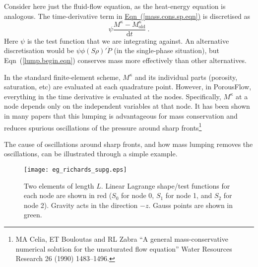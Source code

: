 \documentclass[12pt]{report}
\def\species{\kappa}
\def\d{\mathrm{d}}
\begin{document}
Consider here just the fluid-flow equation, as the heat-energy
equation is analogous.  The time-derivative term in
\hyperref[mass.cons.sp.eqn]{Eqn~(\ref*{mass.cons.sp.eqn})} is discretised as
\begin{equation}
\psi \frac{M^{\species} - M^{\species}_{\mathrm{old}}}{\d t} \ .
\label{lump.begin.eqn}
\end{equation}
Here $\psi$ is the test function that we are integrating against.  An
alternative discretisation would be $\psi\phi(S\rho)'\dot{P}$ (in the
single-phase situation), but Eqn~(\ref{lump.begin.eqn}) conserves mass
more effectively than other alternatives.

In the standard finite-element scheme, $M^{\species}$ and its
individual parts (porosity, saturation, etc) are evaluated at each
quadrature point.  However, in PorousFlow, everything in the time
derivative is evaluated at the nodes.  Specifically, $M^{\species}$ at
a node depends only on the independent variables at that node.  It has
been shown in many papers that this lumping is advantageous for mass
conservation and reduces spurious oscillations of the pressure around
sharp fronts\footnote{MA Celia, ET Bouloutas and RL Zabra ``A general
  mass-conservative numerical solution for the unsaturated flow
  equation''  Water Resources Research 26 (1990) 1483--1496.}

The cause of oscillations around sharp fronts, and how mass lumping
removes the oscillations, can be illustrated through a simple example.

\begin{figure}[htb]
\centering
\texttt{[image: eg\_richards\_supg.eps]}
\caption{Two elements of length $L$.  Linear Lagrange shape/test
  functions for each node are shown in red ($S_{0}$ for node 0,
  $S_{1}$ for node 1, and $S_{2}$ for node 2).  Gravity acts in the
  direction $-z$.  Gauss points are shown in green.}
\label{eg_richards_supg.fig}
\end{figure}
\end{document}
